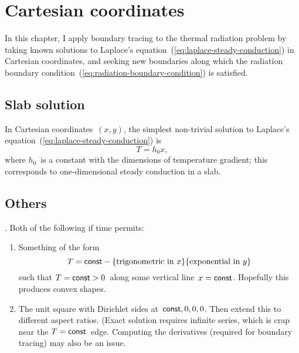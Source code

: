 \chapter{Cartesian coordinates}
\label{ch:cartesian}

In this chapter,
I apply boundary tracing to the thermal radiation problem
by taking known solutions
to Laplace's equation~(\ref{eq:laplace-steady-conduction})
in Cartesian coordinates,
and seeking new boundaries along which
the radiation boundary condition~(\ref{eq:radiation-boundary-condition})
is satisfied.

\section{Slab solution}

In Cartesian coordinates~$(x, y)$,
the simplest non-trivial solution
to Laplace's equation~(\ref{eq:laplace-steady-conduction})
is
\begin{equation}
  T = h_0 x,
  \label{eq:laplace-solution-slab}
\end{equation}
where $h_0$~is a constant with the dimensions of temperature gradient;
this corresponds to one-dimensional steady conduction in a slab.

\section{Others}

\tbd. Both of the following if time permits:
\begin{enumerate}
  \item
    Something of the form
    \[
      T = \mathsf{const} - \{\text{trigonometric in~$x$}\} \{\text{exponential in~$y$}\}
    \]
    such that $T = \mathsf{const} > 0$~along some vertical line~$x = \mathsf{const}$.
    Hopefully this produces convex shapes.
  \item
    The unit square with Dirichlet sides at~$\mathsf{const}, 0, 0, 0$.
    Then extend this to different aspect ratios.
    (Exact solution requires infinite series,
    which is crap near the $T = \mathsf{const}$~edge.
    Computing the derivatives (required for boundary tracing)
    may also be an issue.
\end{enumerate}
